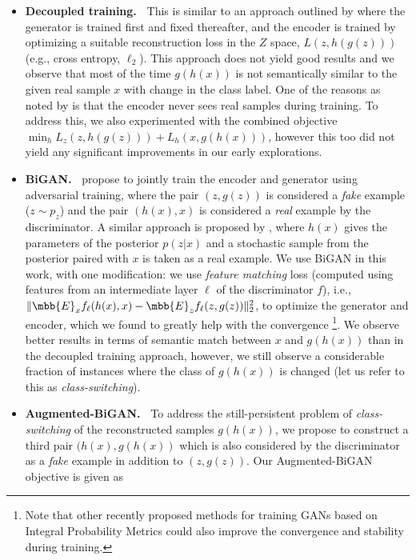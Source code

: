 \documentclass{article}
\begin{document}
\begin{itemize}[noitemsep,topsep=0pt,parsep=0pt,partopsep=0pt,leftmargin=*]
\item {\bf Decoupled training.~} This is similar to an approach outlined by \citet{donahue2016adversarial} where the generator is trained first and fixed thereafter, and the encoder is trained by optimizing a suitable reconstruction loss in the $Z$ space, $L(z,h(g(z)))$ (e.g., cross entropy, $\ell_2$). This approach does not yield good results and we observe that most of the time $g(h(x))$ is not semantically similar to the given real sample $x$ with change in the class label. One of the reasons as noted by \citet{donahue2016adversarial} is that the encoder never sees real samples during training. To address this, we also experimented with the combined objective $\min_h L_z(z,h(g(z)))+L_h(x,g(h(x)))$, however this too did not yield any significant improvements in our early explorations. 
\item {\bf BiGAN.~} \citet{donahue2016adversarial} propose to jointly train the encoder and generator using adversarial training, where the pair $(z,g(z))$ is considered a \emph{fake} example ($z\sim p_z$) and the pair $(h(x), x)$ is considered a \emph{real} example by the discriminator. A similar approach is proposed by \citet{dumoulin2016adversarially}, where $h(x)$ gives the parameters of the posterior $p(z|x)$ and a stochastic sample from the posterior paired with $x$ is taken as a real example. We use BiGAN \cite{donahue2016adversarial} in this work, with one modification: we use \emph{feature matching} loss \cite{salimans2016improved} (computed using features from an intermediate layer $\ell$ of the discriminator $f$), i.e., $\lVert \mbb{E}_x f_{\ell}(h(x),x) - \mbb{E}_z f_{\ell}(z,g(z))\rVert_2^2$, to optimize the generator and encoder, which we found to greatly help with the convergence \footnote{Note that other recently proposed methods for training GANs based on Integral Probability Metrics \cite{arjovsky2017wasserstein,gulrajani2017improved,mroueh2017mcgan,mroueh2017fisher} could also improve the convergence and stability during training.}. We observe better results in terms of semantic match between $x$ and $g(h(x))$ than in the decoupled training approach, however, we still observe a considerable fraction of instances where the class of $g(h(x))$ is changed (let us refer to this as \emph{class-switching}). 
\item {\bf Augmented-BiGAN.~} To address the still-persistent problem of \emph{class-switching} of the reconstructed samples $g(h(x))$, we propose to construct a third pair $(h(x), g(h(x))$ which is also considered by the discriminator as a \emph{fake} example in addition to $(z,g(z))$. Our Augmented-BiGAN objective is given as

\end{itemize}
\end{document}
